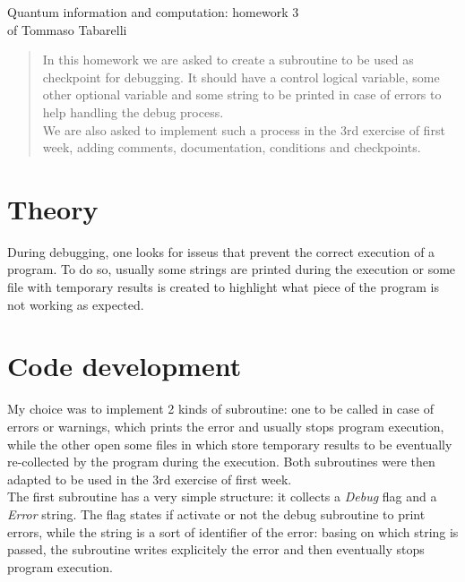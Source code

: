 \documentclass[12pt, a4paper, notitlepage]{report}
\begin{document}
\begin{center}
	\LARGE{Quantum information and computation: homework 3}\\
	\Large{of Tommaso Tabarelli}
\end{center}


\begin{abstract}
	In this homework we are asked to create a subroutine to be used as checkpoint for debugging. It should have a control logical variable, some other optional variable and some string to be printed in case of errors to help handling the debug process.\\
	We are also asked to implement such a process in the 3rd exercise of first week, adding comments, documentation, conditions and checkpoints.
\end{abstract}

\section*{Theory}
During debugging, one looks for isseus that prevent the correct execution of a program. To do so, usually some strings are printed during the execution or some file with temporary results is created to highlight what piece of the program is not working as expected.

\section*{Code development}
My choice was to implement 2 kinds of subroutine: one to be called in case of errors or warnings, which prints the error and usually stops program execution, while the other open some files in which store temporary results to be eventually re-collected by the program during the execution. Both subroutines were then adapted to be used in the 3rd exercise of first week.\\

The first subroutine has a very simple structure: it collects a \textit{Debug} flag and a \textit{Error} string. The flag states if activate or not the debug subroutine to print errors, while the string is a sort of identifier of the error: basing on which string is passed, the subroutine writes explicitely the error and then eventually stops program execution.
\end{document}
